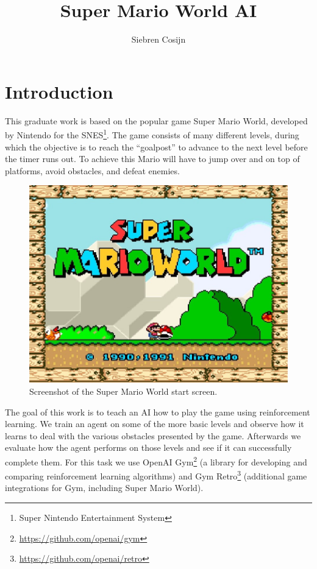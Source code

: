 \documentclass[a4paper]{article}
\title{Super Mario World AI}
\author{Siebren Cosijn}
\date{\displaydate{date}}
\begin{document}
\maketitle

\section{Introduction} \label{s:introduction}
This graduate work is based on the popular game Super Mario World, developed by Nintendo for the SNES\footnote{Super Nintendo Entertainment System}.
The game consists of many different levels, during which the objective is to reach the ``goalpost'' to advance to the next level before the timer runs out.
To achieve this Mario will have to jump over and on top of platforms, avoid obstacles, and defeat enemies.
\begin{figure}[htbp]
    \centering
    \includegraphics[width=.6\textwidth]{start-screen}
    \caption{Screenshot of the Super Mario World start screen.}
    \label{fig:smw}
\end{figure}

The goal of this work is to teach an AI how to play the game using reinforcement learning.
We train an agent on some of the more basic levels and observe how it learns to deal with the various obstacles presented by the game.
Afterwards we evaluate how the agent performs on those levels and see if it can successfully complete them.
For this task we use OpenAI Gym\footnote{\url{https://github.com/openai/gym}} (a library for developing and comparing reinforcement learning algorithms) and Gym Retro\footnote{\url{https://github.com/openai/retro}} (additional game integrations for Gym, including Super Mario World).
\end{document}
